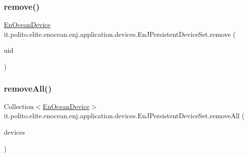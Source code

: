 \subsubsection{\texorpdfstring{remove()}{remove()}\hspace{0.1cm}{\footnotesize\ttfamily [2/2]}}
{\footnotesize\ttfamily \hyperlink{classit_1_1polito_1_1elite_1_1enocean_1_1enj_1_1model_1_1_en_ocean_device}{En\+Ocean\+Device} it.\+polito.\+elite.\+enocean.\+enj.\+application.\+devices.\+En\+J\+Persistent\+Device\+Set.\+remove (\begin{DoxyParamCaption}\item[{int}]{uid }\end{DoxyParamCaption})}

\hypertarget{classit_1_1polito_1_1elite_1_1enocean_1_1enj_1_1application_1_1devices_1_1_en_j_persistent_device_set_a6344f14df38bf2f5081c9404f86ad124}{}\label{classit_1_1polito_1_1elite_1_1enocean_1_1enj_1_1application_1_1devices_1_1_en_j_persistent_device_set_a6344f14df38bf2f5081c9404f86ad124} 
\subsubsection{\texorpdfstring{remove\+All()}{removeAll()}\hspace{0.1cm}{\footnotesize\ttfamily [1/2]}}
{\footnotesize\ttfamily Collection$<$\hyperlink{classit_1_1polito_1_1elite_1_1enocean_1_1enj_1_1model_1_1_en_ocean_device}{En\+Ocean\+Device}$>$ it.\+polito.\+elite.\+enocean.\+enj.\+application.\+devices.\+En\+J\+Persistent\+Device\+Set.\+remove\+All (\begin{DoxyParamCaption}\item[{Collection$<$ \hyperlink{classit_1_1polito_1_1elite_1_1enocean_1_1enj_1_1model_1_1_en_ocean_device}{En\+Ocean\+Device} $>$}]{devices }\end{DoxyParamCaption})}

\hypertarget{classit_1_1polito_1_1elite_1_1enocean_1_1enj_1_1application_1_1devices_1_1_en_j_persistent_device_set_a8fc946aebf19233b1df176d7a48bf9d4}{}\label{classit_1_1polito_1_1elite_1_1enocean_1_1enj_1_1application_1_1devices_1_1_en_j_persistent_device_set_a8fc946aebf19233b1df176d7a48bf9d4} 
